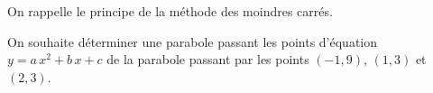 
On rappelle le principe de la méthode des moindres carrés.

On souhaite déterminer une parabole passant les points d'équation $y=a\,x^2+b\,x+c$ de la parabole passant par les points $(-1,9)$, $(1,3)$ et $(2,3)$.

